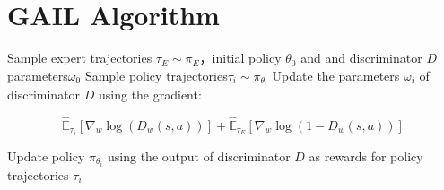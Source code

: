 \documentclass[11pt]{ctexart}
\begin{document}
\clearpage
\clearpage

\section{GAIL Algorithm}
\begin{algorithm}[H] %
	\renewcommand{\thealgorithm}{} %
	\caption{} 
	\begin{algorithmic}[1] %
		\STATE Sample expert trajectories $\tau _{E} \sim \pi _{E}$，initial policy $\theta _{0}$ and and discriminator $D$ parameters$\omega _{0}$
			\STATE Sample policy trajectories$\tau_{i} \sim \pi _{\theta _{i}}$
			\STATE Update the parameters $\omega _{i}$ of discriminator $D$ using the gradient:
			\begin{center}
				\begin{equation}
				\hat{\mathbb{E}}_{\tau_{i}}\left[\nabla_{w} \log \left(D_{w}(s, a)\right)\right]+\hat{\mathbb{E}}_{\tau_{E}}\left[\nabla_{w} \log \left(1-D_{w}(s, a)\right)\right]
				\end{equation}
			\end{center}
			\STATE Update policy $\pi _{\theta _{i}}$ using the output of discriminator $D$ as rewards for policy trajectories $\tau_{i}$\footnotemark[2]
		\ENDFOR
	\end{algorithmic}
\end{algorithm}
\clearpage
\end{document}
